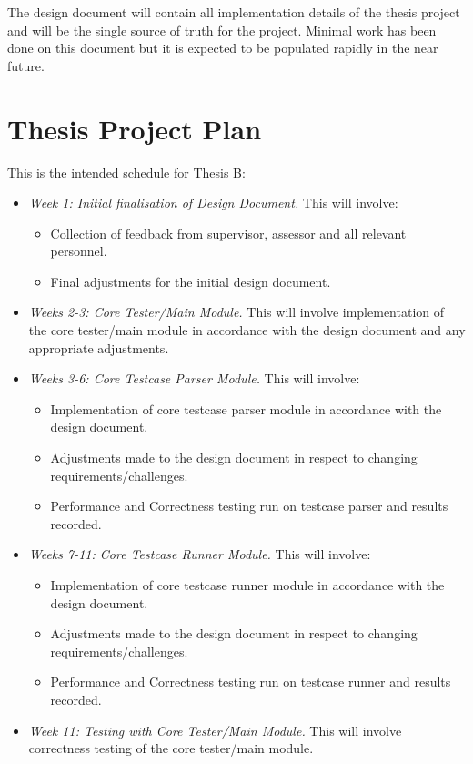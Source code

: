\documentclass[hidelinks]{report}
\begin{document}
The design document will contain all implementation details of the thesis project and will be the single source of truth for the project. Minimal work has been done on this document but it is expected to be populated rapidly in the near future.

\section{Thesis Project Plan}

This is the intended schedule for Thesis B:
\begin{itemize}
	\item \textit{Week 1: Initial finalisation of Design Document.} This will involve:
	\begin{itemize}
		\item Collection of feedback from supervisor, assessor and all relevant personnel.
		\item Final adjustments for the initial design document.
	\end{itemize}
	\item \textit{Weeks 2-3: Core Tester/Main Module.} This will involve implementation of the core tester/main module in accordance with the design document and any appropriate adjustments.
	\item \textit{Weeks 3-6: Core Testcase Parser Module.} This will involve:
	\begin{itemize}
		\item Implementation of core testcase parser module in accordance with the design document.
		\item Adjustments made to the design document in respect to changing requirements/challenges.
		\item Performance and Correctness testing run on testcase parser and results recorded.
	\end{itemize}
	\item \textit{Weeks 7-11: Core Testcase Runner Module.} This will involve:
	\begin{itemize}
		\item Implementation of core testcase runner module in accordance with the design document.
		\item Adjustments made to the design document in respect to changing requirements/challenges.
		\item Performance and Correctness testing run on testcase runner and results recorded.
	\end{itemize}
	\item \textit{Week 11: Testing with Core Tester/Main Module.} This will involve correctness testing of the core tester/main module.
\end{itemize}
\end{document}
